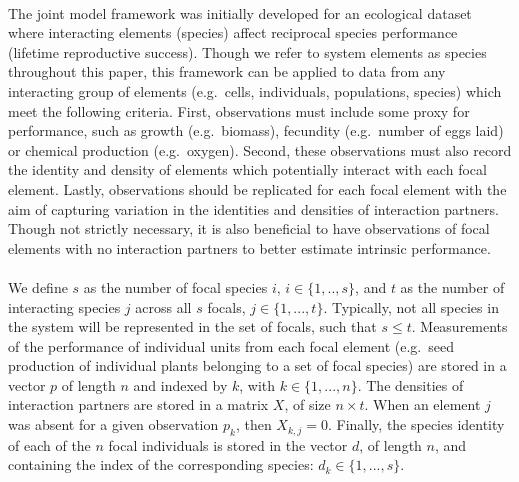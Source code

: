 \documentclass[a4,12pt]{article}
\begin{document}
\begin{refsection}
    \paragraph{}
    The joint model framework was initially developed for an ecological dataset where interacting elements (species) affect reciprocal species performance (lifetime reproductive success). Though we refer to system elements as species throughout this paper, this framework can be applied to data from any interacting group of elements (e.g.\ cells, individuals, populations, species) which meet the following criteria. First, observations must include some proxy for performance, such as growth (e.g.\ biomass), fecundity (e.g.\ number of eggs laid) or chemical production (e.g.\ oxygen). Second, these observations must also record the identity and density of elements which potentially interact with each focal element. Lastly, observations should be replicated for each focal element with the aim of capturing variation in the identities and densities of interaction partners. Though not strictly necessary, it is also beneficial to have observations of focal elements with no interaction partners to better estimate intrinsic performance. 

    \paragraph{}
    We define $s$ as the number of focal species $i$, $i \in \{ 1, .., s \}$, and $t$ as the number of interacting species $j$ across all $s$ focals, $j \in \{1, ..., t \}$. Typically, not all species in the system will be represented in the set of focals, such that $s \le t$. Measurements of the performance of individual units from each focal element (e.g.\ seed production of individual plants belonging to a set of focal species) are stored in a vector $p$ of length $n$ and indexed by $k$, with $k \in \{1, ..., n \}$. The densities of interaction partners are stored in a matrix $X$, of size $n \times t$. When an element $j$ was absent for a given observation $p_k$, then $X_{k,j} = 0$. Finally, the species identity of each of the $n$ focal individuals is stored in the vector $d$, of length $n$, and containing the index of the corresponding species: $d_k \in \{1, ..., s \}$.


\end{refsection}
\end{document}
